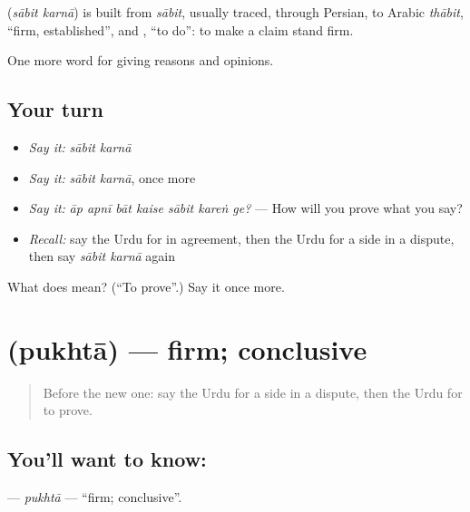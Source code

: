 \begin{cousinweb}
\textbf{ } (\emph{sābit karnā}) is built from \emph{sābit}, usually traced, through Persian, to Arabic \emph{thābit}, \textquotedblleft{}firm, established\textquotedblright{}, and \textbf{}, \textquotedblleft{}to do\textquotedblright{}: to make a claim stand firm.
\end{cousinweb}

\begin{grammarlens}[title={What you've built}]
One more word for giving reasons and opinions.
\end{grammarlens}

\subsection*{Your turn}
\begin{itemize}
\raggedright
  \item \emph{Say it:} \emph{sābit karnā}
  \item \emph{Say it:} \emph{sābit karnā}, once more
  \item \emph{Say it:} \emph{āp apnī bāt kaise sābit kareṅ ge?} — How will you prove what you say?
  \item \emph{Recall:} say the Urdu for in agreement, then the Urdu for a side in a dispute, then say \emph{sābit karnā} again
\end{itemize}

\begin{tcolorbox}[breakable,colback=teal!4,colframe=teal!35!black,title={Before you move on}]
What does   mean? (\textquotedblleft{}To prove\textquotedblright{}.) Say it once more.
\end{tcolorbox}
\section[\texorpdfstring{\ur{پختہ} (pukhtā)}{پختہ (pukhtā)}]{ (pukhtā) — firm; conclusive}

\label{lesson:UR-C336-pukhta}



\begin{quote}
Before the new one: say the Urdu for a side in a dispute, then the Urdu for to prove.
\end{quote}

\subsection*{You'll want to know: }
\textbf{} — \emph{pukhtā} — \textquotedblleft{}firm; conclusive\textquotedblright{}.

